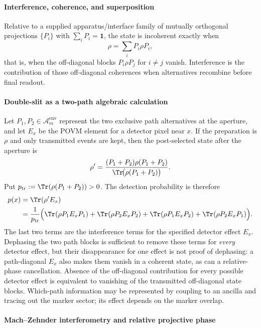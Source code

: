 \documentclass[12pt,a4paper]{article}
\begin{document}
\paragraph{Interference, coherence, and superposition}
\label{p4:sec:part2-interference}

Relative to a supplied apparatus/interface family of mutually orthogonal projections $\{P_i\}$ with $\sum_iP_i=\mathbf 1$, the state is incoherent exactly when
\[
\rho=\sum_i P_i\rho P_i,
\]
that is, when the off-diagonal blocks $P_i\rho P_j$ for $i\neq j$ vanish.
Interference is the contribution of those off-diagonal coherences when alternatives recombine before final readout.



\paragraph{Double-slit as a two-path algebraic calculation}
\label{p4:sec:part2-double-slit}

Let $P_1,P_2\in\mathcal A_m^{\mathrm{env}}$ represent the two exclusive path alternatives at the aperture, and let $E_x$ be the POVM element for a detector pixel near $x$.
If the preparation is $\rho$ and only transmitted events are kept, then the post-selected state after the aperture is
\[
\rho'=
\frac{(P_1+P_2)\rho(P_1+P_2)}{\Tr\!\bigl(\rho(P_1+P_2)\bigr)}.
\]
Put
\(p_{\rm tr}:=\Tr(\rho(P_1+P_2))>0\).
The detection probability is therefore
\begin{align}
\label{p4:eq:part2-double-slit}
p(x)
&=\Tr(\rho' E_x) \\
&=\frac{1}{p_{\rm tr}}\Bigl(
\Tr(\rho P_1E_xP_1)+\Tr(\rho P_2E_xP_2)
+\Tr(\rho P_1E_xP_2)+\Tr(\rho P_2E_xP_1)
\Bigr).
\end{align}
The last two terms are the interference terms for the specified detector
effect \(E_x\). Dephasing the two path blocks is sufficient to remove
these terms for \emph{every} detector effect, but their disappearance for
one effect is not proof of dephasing: a path-diagonal \(E_x\) also makes
them vanish in a coherent state, as can a relative-phase cancellation.
Absence of the off-diagonal contribution for every possible detector effect
is equivalent to vanishing of the transmitted off-diagonal state blocks.
Which-path information may be represented by coupling to an ancilla and
tracing out the marker sector; its effect depends on the marker overlap.



\paragraph{Mach--Zehnder interferometry and relative projective phase}
\label{p4:sec:part2-mzi}
\end{document}
